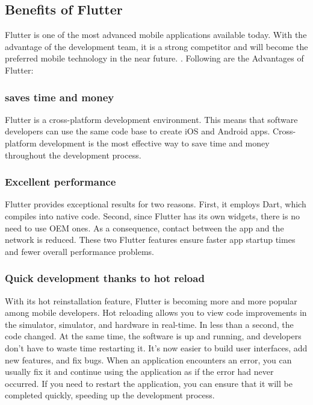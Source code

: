 \subsection{Benefits of Flutter}
Flutter is one of the most advanced mobile applications available today. With the advantage of the development team, it is a strong competitor and will become the preferred mobile technology in the near future. \cite{WhatisFlutter-Benefits:online}. Following are the Advantages of Flutter:
\subsubsection{saves time and money}
Flutter is a cross-platform development environment. This means that software developers can use the same code base to create iOS and Android apps. Cross-platform development is the most effective way to save time and money throughout the development process.
\subsubsection{Excellent performance}
Flutter provides exceptional results for two reasons. First, it employs Dart, which compiles into native code. Second, since Flutter has its own widgets, there is no need to use OEM ones. As a consequence, contact between the app and the network is reduced. These two Flutter features ensure faster app startup times and fewer overall performance problems.
\subsubsection{Quick development thanks to hot reload}
With its hot reinstallation feature, Flutter is becoming more and more popular among mobile developers. Hot reloading allows you to view code improvements in the simulator, simulator, and hardware in real-time. In less than a second, the code changed. At the same time, the software is up and running, and developers don't have to waste time restarting it. It’s now easier to build user interfaces, add new features, and fix bugs. When an application encounters an error, you can usually fix it and continue using the application as if the error had never occurred. If you need to restart the application, you can ensure that it will be completed quickly, speeding up the development process.
